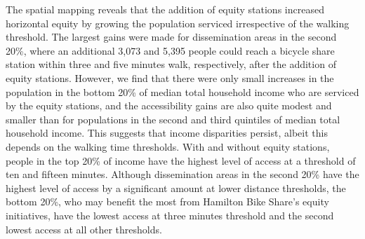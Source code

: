 \documentclass[]{elsarticle} %
\begin{document}
The spatial mapping reveals that the addition of equity stations
increased horizontal equity by growing the population serviced
irrespective of the walking threshold. The largest gains were made for
dissemination areas in the second 20\%, where an additional 3,073 and
5,395 people could reach a bicycle share station within three and five
minutes walk, respectively, after the addition of equity stations.
However, we find that there were only small increases in the population
in the bottom 20\% of median total household income who are serviced by
the equity stations, and the accessibility gains are also quite modest
and smaller than for populations in the second and third quintiles of
median total household income. This suggests that income disparities
persist, albeit this depends on the walking time thresholds. With and
without equity stations, people in the top 20\% of income have the
highest level of access at a threshold of ten and fifteen minutes.
Although dissemination areas in the second 20\% have the highest level
of access by a significant amount at lower distance thresholds, the
bottom 20\%, who may benefit the most from Hamilton Bike Share's equity
initiatives, have the lowest access at three minutes threshold and the
second lowest access at all other thresholds.
\end{document}
